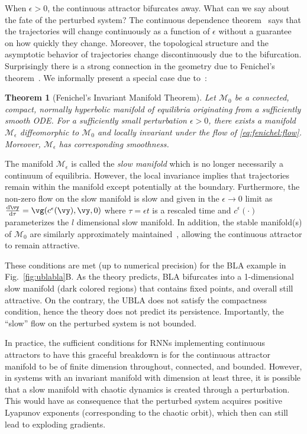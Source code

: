 \documentclass{article}
\newcounter{ct}
\newcommand{\dm}[1]{\ensuremath{\mathrm{d}{#1}}} %
\newcommand{\RN}[2]{\frac{\dm{#1}}{\dm{#2}}} %
\newcommand{\manifold}{\mathcal{M}}
\newtheorem{theorem}{Theorem}
\theoremstyle{definition}
\theoremstyle{remark}
\begin{document}
When $\epsilon > 0$, the continuous attractor bifurcates away.
What can we say about the fate of the perturbed system?
The continuous dependence theorem~\cite{Chicone2006} says that the trajectories will change continuously as a function of $\epsilon$ without a guarantee on how quickly they change.
Moreover, the topological structure and the asymptotic behavior of trajectories change discontinuously due to the bifurcation.
Surprisingly there is a strong connection in the geometry due to Fenichel's theorem~\cite{fenichel1971}.
We informally present a special case due to~\cite{Jones1995}:
\begin{theorem}[Fenichel's Invariant Manifold Theorem]
Let $\manifold_0$ be a connected, compact, normally hyperbolic manifold of equilibria originating from a sufficiently smooth ODE.
For a sufficiently small perturbation $\epsilon > 0$, there exists a manifold $\manifold_\epsilon$ diffeomorphic to $\manifold_0$ and locally invariant under the flow of \eqref{eq:fenichel:flow}.
Moreover, $\manifold_\epsilon$ has corresponding smoothness.
\end{theorem}

The manifold $\manifold_\epsilon$ is called the \emph{slow manifold} which is no longer necessarily a continuum of equilibria.
However, the local invariance implies that trajectories remain within the manifold except potentially at the boundary.
Furthermore, the non-zero flow on the slow manifold is slow and given in the $\epsilon \to 0$ limit as $\RN{\vy}{\tau} = \vg(c^\epsilon(\vy), \vy, 0)$ where $\tau = \epsilon t$ is a rescaled time and $c^\epsilon(\cdot)$ parameterizes the $l$ dimensional slow manifold.
In addition, the stable manifold(s) of $\manifold_0$ are similarly approximately maintained~\cite{Jones1995}, allowing the continuous attractor to remain attractive.

These conditions are met (up to numerical precision) for the BLA example in Fig.~\ref{fig:ublabla}B.
As the theory predicts, BLA bifurcates into a 1-dimensional slow manifold (dark colored regions) that contains fixed points, and overall still attractive.
On the contrary, the UBLA does not satisfy the compactness condition, hence the theory does not predict its persistence.
Importantly, the ``slow'' flow on the perturbed system is not bounded.

In practice, the sufficient conditions for RNNs implementing continuous attractors to have this graceful breakdown is for the continuous attractor manifold to be of finite dimension throughout, connected, and bounded. 
However, in systems with an invariant manifold with dimension at least three, it is possible that a slow manifold with chaotic dynamics is created through a perturbation. This would have as consequence that the perturbed system acquires positive Lyapunov exponents (corresponding to the chaotic orbit), which then can still lead to exploding gradients.
\end{document}
